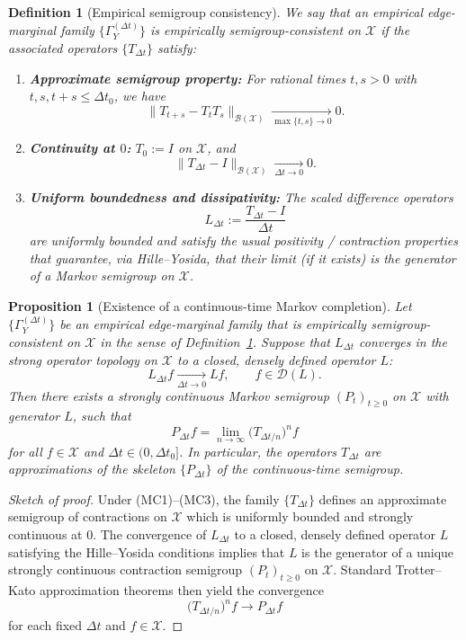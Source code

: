 \documentclass[11pt]{article}
\newtheorem{definition}{Definition}
\newtheorem{proposition}{Proposition}
\newcommand{\Bcal}{\mathcal{B}}
\newcommand{\Xcal}{\mathcal{X}}
\newcommand{\Dcal}{\mathcal{D}}
\begin{document}
\begin{definition}[Empirical semigroup consistency]
\label{def:empirical-semigroup-consistency}
We say that an empirical edge-marginal family
$\{\Gamma_Y^{(\Delta t)}\}$ is \emph{empirically semigroup-consistent}
on $\Xcal$ if the associated operators $\{T_{\Delta t}\}$ satisfy:
\begin{enumerate}[label=(MC\arabic*),leftmargin=1.8em]
  \item \textbf{Approximate semigroup property:} For rational times
  $t,s>0$ with $t,s,t+s\le \Delta t_0$, we have
  \[
    \bigl\|T_{t+s} - T_t T_s\bigr\|_{\Bcal(\Xcal)}
    \xrightarrow[\max\{t,s\}\to 0]{} 0.
  \]
  \item \textbf{Continuity at $0$:} $T_0 := I$ on $\Xcal$, and
  \[
    \bigl\|T_{\Delta t} - I\bigr\|_{\Bcal(\Xcal)}
    \xrightarrow[\Delta t\to 0]{} 0.
  \]
  \item \textbf{Uniform boundedness and dissipativity:} The scaled
  difference operators
  \[
    L_{\Delta t}
    := \frac{T_{\Delta t} - I}{\Delta t}
  \]
  are uniformly bounded and satisfy the usual positivity / contraction
  properties that guarantee, via Hille--Yosida, that their limit (if it
  exists) is the generator of a Markov semigroup on $\Xcal$.
\end{enumerate}
\end{definition}

\begin{proposition}[Existence of a continuous-time Markov completion]
\label{prop:continuous-markov-completion}
Let $\{\Gamma_Y^{(\Delta t)}\}$ be an empirical edge-marginal family
that is empirically semigroup-consistent on $\Xcal$ in the sense of
Definition~\ref{def:empirical-semigroup-consistency}. Suppose that
$L_{\Delta t}$ converges in the strong operator topology on $\Xcal$ to a
closed, densely defined operator $L$:
\[
  L_{\Delta t} f \xrightarrow[\Delta t\to 0]{} Lf,
  \qquad f\in\Dcal(L).
\]
Then there exists a strongly continuous Markov semigroup
$(P_t)_{t\ge 0}$ on $\Xcal$ with generator $L$, such that
\[
  P_{\Delta t} f
  = \lim_{n\to\infty} \bigl(T_{\Delta t/n}\bigr)^n f
\]
for all $f\in\Xcal$ and $\Delta t\in(0,\Delta t_0]$. In particular, the
operators $T_{\Delta t}$ are approximations of the skeleton
$\{P_{\Delta t}\}$ of the continuous-time semigroup.
\end{proposition}

\begin{proof}[Sketch of proof]
Under (MC1)–(MC3), the family $\{T_{\Delta t}\}$ defines an approximate
semigroup of contractions on $\Xcal$ which is uniformly bounded and
strongly continuous at $0$. The convergence of $L_{\Delta t}$ to a
closed, densely defined operator $L$ satisfying the Hille--Yosida
conditions implies that $L$ is the generator of a unique strongly
continuous contraction semigroup $(P_t)_{t\ge 0}$ on $\Xcal$. Standard
Trotter--Kato approximation theorems then yield the convergence
\[
  \bigl(T_{\Delta t/n}\bigr)^n f \to P_{\Delta t} f
\]
for each fixed $\Delta t$ and $f\in\Xcal$.
\end{proof}
\end{document}
